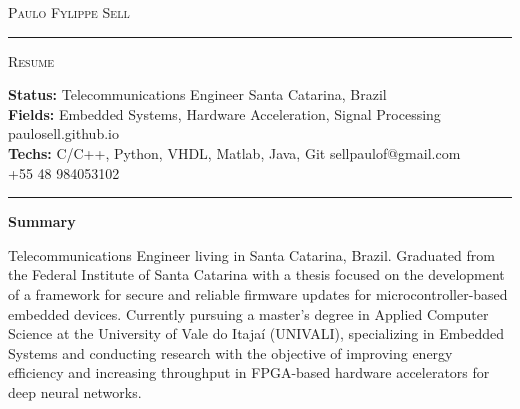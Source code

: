 \documentclass[10pt,A4]{article}
\newcommand{\sectionspace}{
	\vspace{0.1cm}
}
\newcommand{\cvsection}[1]
{
	\begin{center}
		\large\textcolor{sectcol}{\textbf{#1}}
	\end{center}
	\sectionspace
}
\newcommand{\metasection}[2]
{
\footnotesize{#2} \hspace*{\fill} \footnotesize{#1}\\[1pt]
}
\begin{document}
\pagestyle{fancy}	








\vspace{-8pt}
\begin{center}
	\HUGE \textsc{Paulo Fylippe Sell} \textcolor{sectcol}{\rule[-1mm]{1mm}{0.9cm}} \textsc{Resume}\\[2pt]
	
\end{center}



\vspace{6pt}


\metasection{Santa Catarina, Brazil}{\textbf{Status:} Telecommunications Engineer}
\metasection{paulosell.github.io}{\textbf{Fields:} Embedded Systems, Hardware Acceleration, Signal Processing}
\metasection{sellpaulof@gmail.com}{\textbf{Techs:} C/C++, Python, VHDL, Matlab, Java, Git}
\metasection{+55 48 984053102}{}
\vspace{-2pt}
\textcolor{softcol}{\hrule}
\vspace{6pt}

\normalsize

\vspace{-6pt}
\cvsection{Summary}
Telecommunications Engineer living in Santa Catarina, Brazil. Graduated from the Federal Institute of Santa Catarina with a thesis focused on the development of a framework for secure and reliable firmware updates for microcontroller-based embedded devices. Currently pursuing a master's degree in Applied Computer Science at the University of Vale do Itajaí (UNIVALI), specializing in Embedded Systems and conducting research with the objective of improving energy efficiency and increasing throughput in FPGA-based hardware accelerators for deep neural networks.\\
\end{document}
